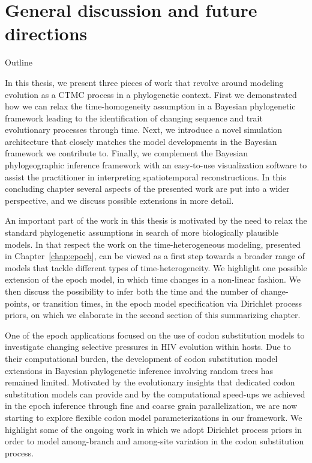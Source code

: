 \chapter{General discussion and future directions}

\begin{remark}{Outline}

In this thesis, we present three pieces of work that revolve around modeling evolution as a CTMC process in a phylogenetic context. 
First we demonstrated how we can relax the time-homogeneity assumption in a Bayesian phylogenetic framework leading to the identification of changing sequence and trait evolutionary processes through time.
Next, we introduce a novel simulation architecture that closely matches the model developments in the Bayesian framework we contribute to.
Finally, we complement the Bayesian phylogeographic inference framework with an easy-to-use visualization software to assist the practitioner in interpreting spatiotemporal reconstructions.
In this concluding chapter several aspects of the presented work are put into a wider perspective, and we discuss possible extensions in more detail. 

An important part of the work in this thesis is motivated by the need to relax the standard phylogenetic assumptions in search of more biologically plausible models. 
In that respect the work on the time-heterogeneous modeling, presented in Chapter~\ref{chap:epoch}, can be viewed as a first step towards a broader range of models that tackle different types of time-heterogeneity.
We highlight one possible extension of the epoch model, in which time changes in a non-linear fashion.
We then discuss the possibility to infer both the time and the number of change-points, or transition times, in the epoch model specification via Dirichlet process priors, on which we elaborate in the second section of this summarizing chapter. 

One of the epoch applications focused on the use of codon substitution models to investigate changing selective pressures in HIV evolution within hosts.
Due to their computational burden, the development of codon substitution model extensions in Bayesian phylogenetic inference involving random trees has remained limited.
Motivated by the evolutionary insights that dedicated codon substitution models can provide and by the computational speed-ups we achieved in the epoch inference through fine and coarse grain parallelization, we are now starting to explore flexible codon model parameterizations in our framework.  
We highlight some of the ongoing work in which we adopt Dirichlet process priors in order to model among-branch and among-site variation in the codon substitution process.


\end{remark}
